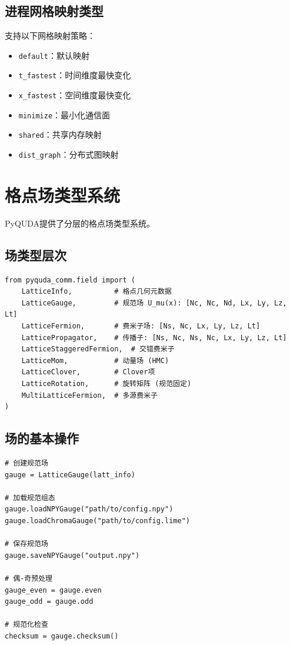 \documentclass[12pt,a4paper]{ctexart}
\begin{document}
\subsection{进程网格映射类型}

支持以下网格映射策略：
\begin{itemize}[leftmargin=*]
    \item \texttt{default}：默认映射
    \item \texttt{t\_fastest}：时间维度最快变化
    \item \texttt{x\_fastest}：空间维度最快变化
    \item \texttt{minimize}：最小化通信面
    \item \texttt{shared}：共享内存映射
    \item \texttt{dist\_graph}：分布式图映射
\end{itemize}

\section{格点场类型系统}

PyQUDA提供了分层的格点场类型系统。

\subsection{场类型层次}

\begin{lstlisting}[caption={格点场类型}, label={lst:field_types}]
from pyquda_comm.field import (
    LatticeInfo,          # 格点几何元数据
    LatticeGauge,         # 规范场 U_mu(x): [Nc, Nc, Nd, Lx, Ly, Lz, Lt]
    LatticeFermion,       # 费米子场: [Ns, Nc, Lx, Ly, Lz, Lt]
    LatticePropagator,    # 传播子: [Ns, Nc, Ns, Nc, Lx, Ly, Lz, Lt]
    LatticeStaggeredFermion,  # 交错费米子
    LatticeMom,           # 动量场 (HMC)
    LatticeClover,        # Clover项
    LatticeRotation,      # 旋转矩阵 (规范固定)
    MultiLatticeFermion,  # 多源费米子
)
\end{lstlisting}

\subsection{场的基本操作}

\begin{lstlisting}[caption={场的创建和操作}, label={lst:field_ops}]
# 创建规范场
gauge = LatticeGauge(latt_info)

# 加载规范组态
gauge.loadNPYGauge("path/to/config.npy")
gauge.loadChromaGauge("path/to/config.lime")

# 保存规范场
gauge.saveNPYGauge("output.npy")

# 偶-奇预处理
gauge_even = gauge.even
gauge_odd = gauge.odd

# 规范化检查
checksum = gauge.checksum()
\end{lstlisting}
\end{document}
